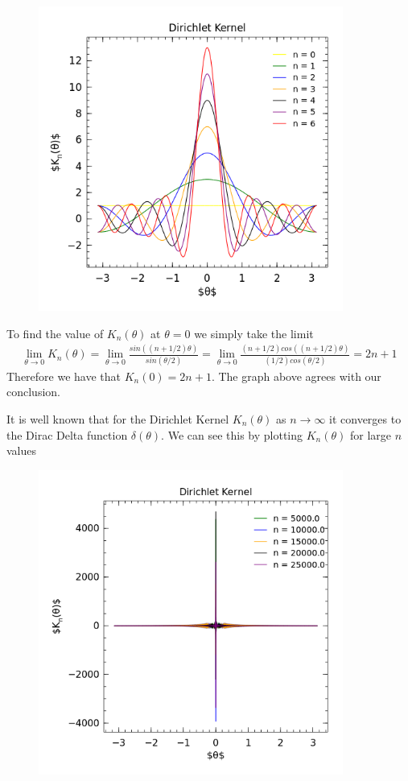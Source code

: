 \documentclass[12pt]{article}
\theoremstyle{remark}
\begin{document}
\begin{figure}[H]
	\centering
	\includegraphics[width=10cm]{Q5.png}
\end{figure}
To find the value of $K_n(\theta)$ at $\theta = 0$ we simply take the limit
\begin{align*}
	\lim\limits_{\theta \rightarrow 0} K_n(\theta) = \lim\limits_{\theta \rightarrow 0} \frac{sin((n+1/2)\theta)}{sin(\theta/2)} = \lim\limits_{\theta \rightarrow 0} \frac{(n+1/2)cos((n+1/2)\theta)}{(1/2)cos(\theta/2)} = 2n+1
\end{align*}
Therefore we have that $K_n(0) = 2n+1$. The graph above agrees with our conclusion. 

\newpage

It is well known that for the Dirichlet Kernel $K_n(\theta)$ as $n \rightarrow \infty$ it converges to the Dirac Delta function $\delta(\theta)$. We can see this by plotting $K_n(\theta)$ for large $n$ values

\begin{figure}[H]
	\centering
	\includegraphics[width=10cm]{Q5_1.png}
\end{figure}
\end{document}

